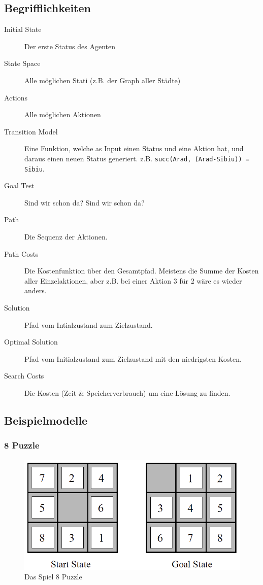 \subsection{Begrifflichkeiten}
\begin{description}
	\item[Initial State] Der erste Status des Agenten
	\item[State Space] Alle möglichen Stati (z.B. der Graph aller Städte)
	\item[Actions] Alle möglichen Aktionen
	\item[Transition Model] Eine Funktion, welche as Input einen Status und eine Aktion hat, und daraus einen neuen Status generiert. z.B. \texttt{succ(Arad, (Arad-Sibiu)) = Sibiu}.
	\item[Goal Test] Sind wir schon da? Sind wir schon da?
	\item[Path] Die Sequenz der Aktionen.
	\item[Path Costs] Die Kostenfunktion über den Gesamtpfad. Meistens die Summe der Kosten aller Einzelaktionen, aber z.B. bei einer Aktion 3 für 2 wäre es wieder anders.
	\item[Solution] Pfad vom Intialzustand zum Zielzustand.
	\item[Optimal Solution] Pfad vom Initialzustand zum Zielzustand mit den niedrigsten Kosten.
	\item[Search Costs] Die Kosten (Zeit \& Speicherverbrauch) um eine Lösung zu finden.
\end{description}

\subsection{Beispielmodelle}
\subsubsection{8 Puzzle}
\begin{figure}[h!]
\centering
\includegraphics[width=0.6\linewidth]{fig/8_puzzle}
\caption{Das Spiel 8 Puzzle}
\label{fig:8_puzzle}
\end{figure}

